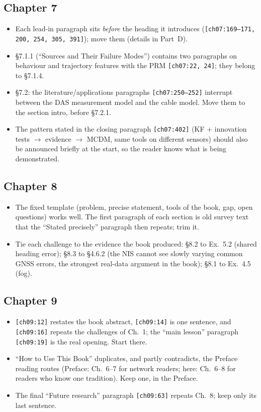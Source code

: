 \documentclass[10pt,a4paper]{article}
\newcommand{\src}[1]{{\footnotesize\texttt{[#1]}}}
\begin{document}
\subsection*{Chapter 7}
\begin{itemize}
\item Each lead-in paragraph sits \emph{before} the heading it introduces (\src{ch07:169--171, 200, 254, 305, 391}); move them (details in Part~D).
\item \S7.1.1 (``Sources and Their Failure Modes'') contains two paragraphs on behaviour and trajectory features with the PRM \src{ch07:22, 24}; they belong to \S7.1.4.
\item \S7.2: the literature/applications paragraphs \src{ch07:250--252} interrupt between the DAS measurement model and the cable model. Move them to the section intro, before \S7.2.1.
\item The pattern stated in the closing paragraph \src{ch07:402} (KF + innovation tests $\to$ evidence $\to$ MCDM, same tools on different sensors) should also be announced briefly at the start, so the reader knows what is being demonstrated.
\end{itemize}

\subsection*{Chapter 8}
\begin{itemize}
\item The fixed template (problem, precise statement, tools of the book, gap, open questions) works well. The first paragraph of each section is old survey text that the ``Stated precisely'' paragraph then repeats; trim it.
\item Tie each challenge to the evidence the book produced: \S8.2 to Ex.~5.2 (shared heading error); \S8.3 to \S4.6.2 (the NIS cannot see slowly varying common GNSS errors, the strongest real-data argument in the book); \S8.1 to Ex.~4.5 (fog).
\end{itemize}

\subsection*{Chapter 9}
\begin{itemize}
\item \src{ch09:12} restates the book abstract, \src{ch09:14} is one sentence, and \src{ch09:16} repeats the challenges of Ch.~1; the ``main lesson'' paragraph \src{ch09:19} is the real opening. Start there.
\item ``How to Use This Book'' duplicates, and partly contradicts, the Preface reading routes (Preface: Ch.~6--7 for network readers; here: Ch.~6--8 for readers who know one tradition). Keep one, in the Preface.
\item The final ``Future research'' paragraph \src{ch09:63} repeats Ch.~8; keep only its last sentence.
\end{itemize}
\end{document}
